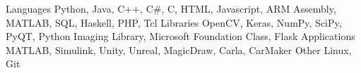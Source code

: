 
\begin{cvskills}
  \cvskill
    {Languages} %
    {Python, Java, C++, C\#, C, HTML, Javascript, ARM Assembly, MATLAB, SQL, Haskell, PHP, Tcl} %
  \cvskill
    {Libraries} %
    {OpenCV, Keras, NumPy, SciPy, PyQT, Python Imaging Library, Microsoft Foundation Class, Flask} %
  \cvskill
    {Applications} %
    {MATLAB, Simulink, Unity, Unreal, MagicDraw, Carla, CarMaker} %
  \cvskill
    {Other} 
    {Linux, Git}
\end{cvskills}